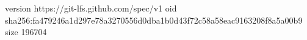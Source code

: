 version https://git-lfs.github.com/spec/v1
oid sha256:fa479246a1d297e78a3270556d0dba1b0d43f72c58a58eac9163208f8a5a00b9
size 196704
